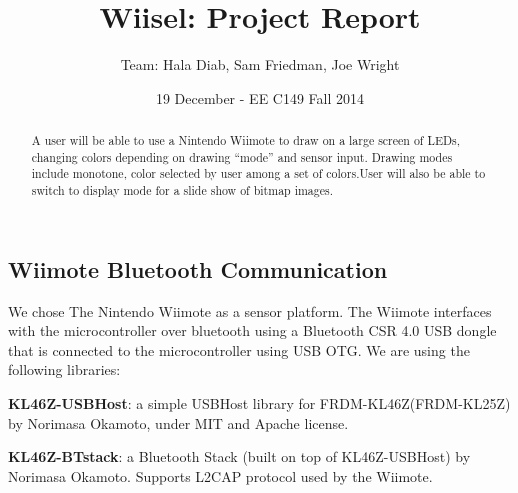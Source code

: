 \documentclass{tufte-handout}
\title{Wiisel: Project Report}
\author{Team: Hala Diab, Sam Friedman, Joe Wright}
\date{19 December - EE C149 Fall 2014}
\begin{document}
\maketitle
\begin{abstract}
    A user will be able to use a Nintendo Wiimote to draw on a large screen of
LEDs, changing colors depending
on drawing ``mode'' and sensor input. Drawing modes include monotone, color selected by user among a set of colors.User will also be able to switch to display mode for a slide show of bitmap images.
\end{abstract}
\subsection{Wiimote Bluetooth Communication}
We chose The Nintendo Wiimote as a sensor platform.
The Wiimote interfaces with the microcontroller over bluetooth using a Bluetooth CSR 4.0 USB dongle that is
connected to the microcontroller using USB OTG. 
We are using the following libraries:

\begin{enumerate*}
    \item
        \textbf{KL46Z-USBHost}:
a simple USBHost library for FRDM-KL46Z(FRDM-KL25Z) by Norimasa Okamoto, under MIT and Apache license.
\item
    \textbf{KL46Z-BTstack}:
a Bluetooth Stack (built on top of KL46Z-USBHost) by Norimasa Okamoto. Supports L2CAP protocol used by the Wiimote.
\end{enumerate*}
\end{document}

